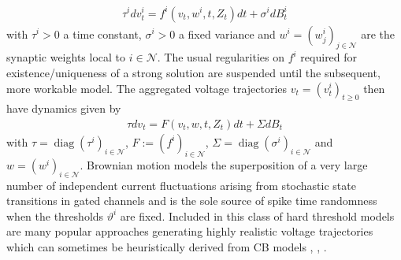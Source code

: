 \documentclass[12pt, oneside]{report}
\newcommand{\1}[1]{\mathbbm{1}_{\{#1\}}}
\newcommand{\mc}[1]{\mathcal{#1}}
\DeclareMathOperator{\diag}{diag} \DeclareMathOperator{\as}{a.s.}
\theoremstyle{definition}
\begin{document}
\begin{align}
    \tau^idv^i_t=f^i(v_t,w^i,t,Z_t)dt+\sigma^idB^i_t\label{eq29}
\end{align}
with $\tau^i>0$ a time constant, $\sigma^i>0$ a fixed variance and
$w^i=(w^i_j)_{j\in\mc{N}}$ are the synaptic weights local to $i\in\mc{N}$. The
usual regularities on $f^i$ required for existence/uniqueness of a strong
solution are suspended until the subsequent, more workable model. The aggregated
voltage trajectories $v_t=(v^i_t)_{t\geq 0}$ then have dynamics given by
\begin{align}
    \tau dv_t=F(v_t,w,t,Z_t)dt+\Sigma dB_t\label{eq30}
\end{align}
with $\tau=\diag(\tau^i)_{i\in\mc{N}}$, $F:=(f^i)_{i\in\mc{N}}$,
$\Sigma=\diag(\sigma^i)_{i\in\mc{N}}$ and $w=(w^i)_{i\in\mc{N}}$. Brownian
motion models the superposition of a very large number of independent current
fluctuations arising from stochastic state transitions in gated channels
\cite{Destexhe_Mainen_Sejnowski_1994} \cite{Faisal_Selen_Wolpert_2008} and is
the sole source of spike time randomness when the thresholds $\vartheta^i$ are
fixed. Included in this class of hard threshold models are many popular
approaches generating highly realistic voltage trajectories which can sometimes
be heuristically derived from CB models
\cite{Fourcaud-Trocmé_Hansel_Van_Vreeswijk_Brunel_2003},
\cite{Jolivet_Lewis_Gerstner_2004}, \cite{Gerstner_Kistler_Naud_Paninski_2014}.
\end{document}
